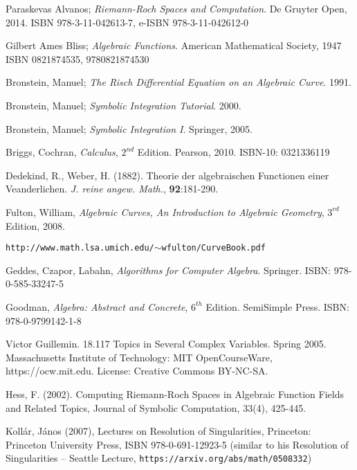 

\begin{thebibliography}{9}

Paraskevas Alvanos;
{\it Riemann-Roch Spaces and Computation}.
De Gruyter Open, 2014.
ISBN 978-3-11-042613-7, e-ISBN 978-3-11-042612-0

Gilbert Ames Bliss; {\it Algebraic Functions}. American Mathematical Society, 1947
ISBN 0821874535, 9780821874530

Bronstein, Manuel; {\it The Risch Differential Equation on an Algebraic Curve}. 1991.

Bronstein, Manuel; {\it Symbolic Integration Tutorial}. 2000.

Bronstein, Manuel; {\it Symbolic Integration I}. Springer, 2005.

Briggs, Cochran, {\it Calculus}, $2^{nd}$ Edition.  Pearson, 2010.  ISBN-10: 0321336119

Dedekind, R., Weber, H. (1882). Theorie der algebraischen Functionen einer Veanderlichen.
{\it J. reine angew. Math.}, {\bf 92}:181-290.

Fulton, William, {\it Algebraic Curves, An Introduction to Algebraic Geometry}, $3^{rd}$ Edition, 2008.

{\tt http://www.math.lsa.umich.edu/$\sim$wfulton/CurveBook.pdf}

Geddes, Czapor, Labahn, {\it Algorithms for Computer Algebra}. Springer.
ISBN: 978-0-585-33247-5

Goodman, {\it Algebra: Abstract and Concrete}, $6^{th}$ Edition.  SemiSimple Press.
ISBN: 978-0-9799142-1-8

Victor Guillemin. 18.117 Topics in Several Complex Variables. Spring 2005. Massachusetts Institute of Technology: MIT OpenCourseWare, https://ocw.mit.edu. License: Creative Commons BY-NC-SA.

Hess, F. (2002). Computing Riemann-Roch Spaces in Algebraic Function Fields and Related Topics,
Journal of Symbolic Computation, 33(4), 425-445.

Kollár, János (2007), Lectures on Resolution of Singularities, Princeton: Princeton University Press, ISBN 978-0-691-12923-5 (similar to his Resolution of Singularities -- Seattle Lecture, {\tt https://arxiv.org/abs/math/0508332})


\end{thebibliography}
